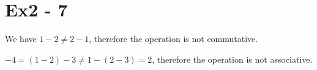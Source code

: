 \section*{Ex2 - 7}
We have $ 1 - 2 \ne 2 - 1 $, therefore the operation is not commutative.

$ -4 = (1 - 2) - 3\ne 1 - (2 - 3) = 2 $, therefore the operation is not associative.

